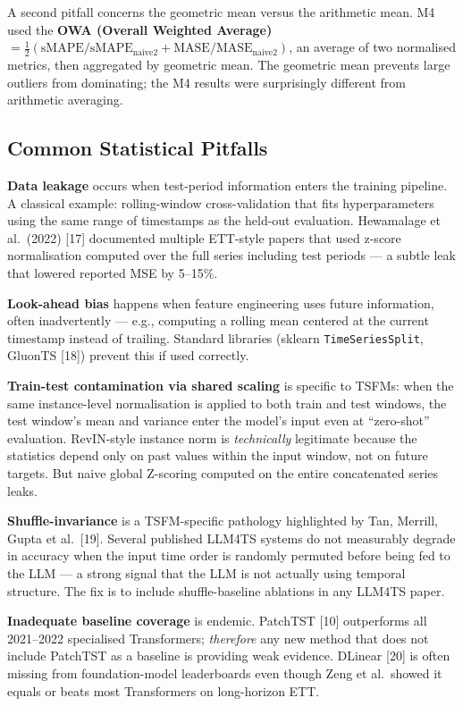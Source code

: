 A second pitfall concerns the geometric mean versus the arithmetic mean. M4 used the \textbf{OWA (Overall Weighted Average)} \(= \frac{1}{2}(\mathrm{sMAPE}/\mathrm{sMAPE}_{\mathrm{naive2}} + \mathrm{MASE}/\mathrm{MASE}_{\mathrm{naive2}})\), an average of two normalised metrics, then aggregated by geometric mean. The geometric mean prevents large outliers from dominating; the M4 results were surprisingly different from arithmetic averaging.

\subsection{Common Statistical Pitfalls}\label{common-statistical-pitfalls}

\textbf{Data leakage} occurs when test-period information enters the training pipeline. A classical example: rolling-window cross-validation that fits hyperparameters using the same range of timestamps as the held-out evaluation. Hewamalage et al.~(2022) {[}17{]} documented multiple ETT-style papers that used z-score normalisation computed over the full series including test periods --- a subtle leak that lowered reported MSE by 5--15\%.

\textbf{Look-ahead bias} happens when feature engineering uses future information, often inadvertently --- e.g., computing a rolling mean centered at the current timestamp instead of trailing. Standard libraries (sklearn \texttt{TimeSeriesSplit}, GluonTS {[}18{]}) prevent this if used correctly.

\textbf{Train-test contamination via shared scaling} is specific to TSFMs: when the same instance-level normalisation is applied to both train and test windows, the test window's mean and variance enter the model's input even at ``zero-shot'' evaluation. RevIN-style instance norm is \emph{technically} legitimate because the statistics depend only on past values within the input window, not on future targets. But naive global Z-scoring computed on the entire concatenated series leaks.

\textbf{Shuffle-invariance} is a TSFM-specific pathology highlighted by Tan, Merrill, Gupta et al.~{[}19{]}. Several published LLM4TS systems do not measurably degrade in accuracy when the input time order is randomly permuted before being fed to the LLM --- a strong signal that the LLM is not actually using temporal structure. The fix is to include shuffle-baseline ablations in any LLM4TS paper.

\textbf{Inadequate baseline coverage} is endemic. PatchTST {[}10{]} outperforms all 2021--2022 specialised Transformers; \emph{therefore} any new method that does not include PatchTST as a baseline is providing weak evidence. DLinear {[}20{]} is often missing from foundation-model leaderboards even though Zeng et al.~showed it equals or beats most Transformers on long-horizon ETT.

